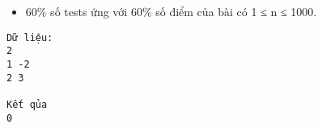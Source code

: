 \begin{itemize}
	\item 60\% số tests ứng với 60\% số điểm của bài có 1 ≤ n ≤ 1000.
\end{itemize}
\begin{verbatim}
Dữ liệu:
2
1 -2
2 3

Kết qủa
0
\end{verbatim}